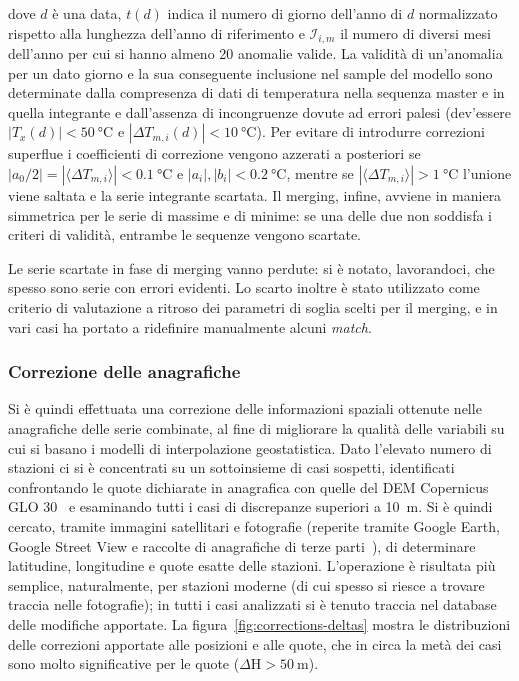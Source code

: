 dove \(d\) è una data, \(t(d)\) indica il numero di giorno dell'anno di \(d\) normalizzato rispetto alla lunghezza dell'anno di riferimento e \(\mathcal{I}_{i,m}\) il numero di diversi mesi dell'anno per cui si hanno almeno 20 anomalie valide. La validità di un'anomalia per un dato giorno e la sua conseguente inclusione nel sample del modello sono determinate dalla compresenza di dati di temperatura nella sequenza master e in quella integrante e dall'assenza di incongruenze dovute ad errori palesi (dev'essere \(|T_x(d)| < \qty{50}{\degreeCelsius}\) e \(|\Delta T_{m,i}(d)| < \qty{10}{\degreeCelsius}\)). Per evitare di introdurre correzioni superflue i coefficienti di correzione vengono azzerati a posteriori se \(|a_0/2| = |\langle \Delta T_{m,i} \rangle| < \qty{0.1}{\degreeCelsius}\) e \(|a_i|, |b_i| < \qty{0.2}{\degreeCelsius}\), mentre se \(|\langle \Delta T_{m,i} \rangle| > \qty{1}{\degreeCelsius}\) l'unione viene saltata e la serie integrante scartata. Il merging, infine, avviene in maniera simmetrica per le serie di massime e di minime: se una delle due non soddisfa i criteri di validità, entrambe le sequenze vengono scartate.

Le serie scartate in fase di merging vanno perdute: si è notato, lavorandoci, che spesso sono serie con errori evidenti. Lo scarto inoltre è stato utilizzato come criterio di valutazione a ritroso dei parametri di soglia scelti per il merging, e in vari casi ha portato a ridefinire manualmente alcuni \emph{match}.

\subsubsection{Correzione delle anagrafiche}
Si è quindi effettuata una correzione delle informazioni spaziali ottenute nelle anagrafiche delle serie combinate, al fine di migliorare la qualità delle variabili su cui si basano i modelli di interpolazione geostatistica. Dato l'elevato numero di stazioni ci si è concentrati su un sottoinsieme di casi sospetti, identificati confrontando le quote dichiarate in anagrafica con quelle del DEM Copernicus GLO 30~\cite{europeanspaceagencyCopernicusGlobalEuropean2022} e esaminando tutti i casi di discrepanze superiori a \qty{10}{\meter}. Si è quindi cercato, tramite immagini satellitari e fotografie (reperite tramite Google Earth, Google Street View e raccolte di anagrafiche di terze parti~\cite{associazionelineameteoStazioniReteLinea}), di determinare latitudine, longitudine e quote esatte delle stazioni. L'operazione è risultata più semplice, naturalmente, per stazioni moderne (di cui spesso si riesce a trovare traccia nelle fotografie); in tutti i casi analizzati si è tenuto traccia nel database delle modifiche apportate. La figura~\ref{fig:corrections-deltas} mostra le distribuzioni delle correzioni apportate alle posizioni e alle quote, che in circa la metà dei casi sono molto significative per le quote (\(\Delta \mathrm{H} > \qty{50}{\meter}\)).

